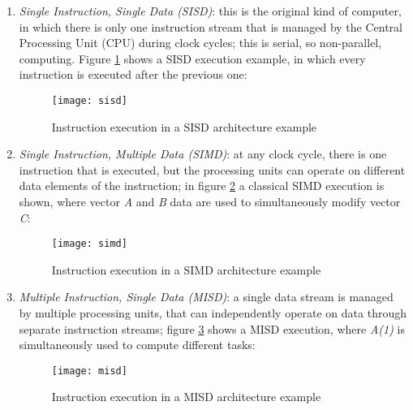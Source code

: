 \begin{enumerate}

    \item \textit{Single Instruction, Single Data (SISD)}: this is the original kind of computer, in which there is only one instruction stream that is managed by the Central Processing Unit (CPU) during clock cycles; this is serial, so non-parallel, computing. Figure \ref{fig::sisd} shows a SISD execution example, in which every instruction is executed after the previous one:
    
    \begin{figure}[H]

        \centering
        \texttt{[image: sisd]}
        \caption{Instruction execution in a SISD architecture example}
        \label{fig::sisd}
    
    \end{figure}
    
    \item \textit{Single Instruction, Multiple Data (SIMD)}: at any clock cycle, there is one instruction that is executed, but the processing units can operate on different data elements of the instruction; in figure \ref{fig::simd} a classical SIMD execution is shown, where vector \textit{A} and \textit{B} data are used to simultaneously modify vector \textit{C}:
    
    \begin{figure}[H]

        \centering
        \texttt{[image: simd]}
        \caption{Instruction execution in a SIMD architecture example}
        \label{fig::simd}
    
    \end{figure}
    
    \item \textit{Multiple Instruction, Single Data (MISD)}: a single data stream is managed by multiple processing units, that can independently operate on data through separate instruction streams; figure \ref{fig::misd} shows a MISD execution, where \textit{A(1)} is simultaneously used to compute different tasks:
    
    \begin{figure}[H]

        \centering
        \texttt{[image: misd]}
        \caption{Instruction execution in a MISD architecture example}
        \label{fig::misd}
    
    \end{figure}
    

\end{enumerate}
